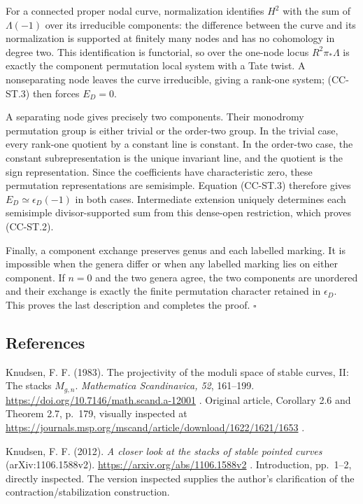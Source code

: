 \documentclass[11pt,a4paper]{article}
\theoremstyle{definition}\newtheorem{definition}[theorem]{Definition}
\theoremstyle{remark}\newtheorem{remark}[theorem]{Remark}
\begin{document}
For a connected proper nodal curve, normalization identifies \(H^2\)
with the sum of \(\Lambda(-1)\) over its irreducible components: the
difference between the curve and its normalization is supported at
finitely many nodes and has no cohomology in degree two. This
identification is functorial, so over the one-node locus
\(R^2\pi_*\Lambda\) is exactly the component permutation local system
with a Tate twist. A nonseparating node leaves the curve irreducible,
giving a rank-one system; (CC-ST.3) then forces \(E_D=0\).

A separating node gives precisely two components. Their monodromy
permutation group is either trivial or the order-two group. In the
trivial case, every rank-one quotient by a constant line is constant. In
the order-two case, the constant subrepresentation is the unique
invariant line, and the quotient is the sign representation. Since the
coefficients have characteristic zero, these permutation representations
are semisimple. Equation (CC-ST.3) therefore gives
\(E_D\simeq\epsilon_D(-1)\) in both cases. Intermediate extension
uniquely determines each semisimple divisor-supported sum from this
dense-open restriction, which proves (CC-ST.2).

Finally, a component exchange preserves genus and each labelled marking.
It is impossible when the genera differ or when any labelled marking
lies on either component. If \(n=0\) and the two genera agree, the two
components are unordered and their exchange is exactly the finite
permutation character retained in \(\epsilon_D\). This proves the last
description and completes the proof. \(\square\)

\subsection{References}

Knudsen, F. F. (1983). The projectivity of the moduli space of stable
curves, II: The stacks \(M_{g,n}\). \emph{Mathematica Scandinavica, 52},
161--199. \url{https://doi.org/10.7146/math.scand.a-12001} . Original article,
Corollary 2.6 and Theorem 2.7, p.~179, visually inspected at
\url{https://journals.msp.org/mscand/article/download/1622/1621/1653} .

Knudsen, F. F. (2012). \emph{A closer look at the stacks of stable
pointed curves} (arXiv:1106.1588v2). \url{https://arxiv.org/abs/1106.1588v2} .
Introduction, pp.~1--2, directly inspected. The version inspected
supplies the author's clarification of the contraction/stabilization
construction.
\end{document}
